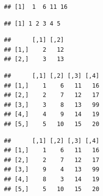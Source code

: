 \documentclass[krantz2]{krantz}\usepackage{knitr}%
\begin{document}
\begin{knitrout}\footnotesize
{}\color{fgcolor}\begin{kframe}
\begin{alltt}
\hlstd{A[}\hlstd{, ]}
\end{alltt}
\begin{verbatim}
## [1]  1  6 11 16
\end{verbatim}
\begin{alltt}
\hlstd{A[ ,} \hlstd{]}
\end{alltt}
\begin{verbatim}
## [1] 1 2 3 4 5
\end{verbatim}
\begin{alltt}
\hlstd{A[}\hlopt{:}\hlstd{,} \hlstd{(}\hlstd{,}\hlstd{)]}
\end{alltt}
\begin{verbatim}
##      [,1] [,2]
## [1,]    2   12
## [2,]    3   13
\end{verbatim}
\begin{alltt}
\hlstd{A[}\hlstd{,} \hlstd{]} \hlkwb{<-} 
\end{alltt}
\begin{verbatim}
##      [,1] [,2] [,3] [,4]
## [1,]    1    6   11   16
## [2,]    2    7   12   17
## [3,]    3    8   13   99
## [4,]    4    9   14   19
## [5,]    5   10   15   20
\end{verbatim}
\begin{alltt}
\hlstd{A[}\hlopt{:}\hlstd{,} \hlopt{:}\hlstd{]} \hlkwb{<-} \hlstd{A[}\hlopt{:}\hlstd{,} \hlopt{:}\hlstd{]}
\end{alltt}
\begin{verbatim}
##      [,1] [,2] [,3] [,4]
## [1,]    1    6   11   16
## [2,]    2    7   12   17
## [3,]    9    4   13   99
## [4,]    8    3   14   19
## [5,]    5   10   15   20
\end{verbatim}
\end{kframe}
\end{knitrout}
\end{document}
